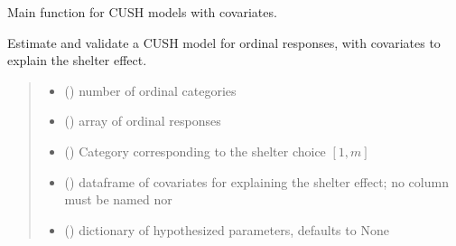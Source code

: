 \documentclass[letterpaper,10pt,english]{sphinxmanual}
\begin{document}

\begin{fulllineitems}
\label{\detokenize{cubmods:cubmods.cush_x.mle}}
\pysigstartsignatures
{}
\pysigstopsignatures
\sphinxAtStartPar
Main function for CUSH models with covariates.

\sphinxAtStartPar
Estimate and validate a CUSH model for ordinal responses, with covariates
to explain the shelter effect.
\begin{quote}\begin{description}
\begin{itemize}
\item {} 
\sphinxAtStartPar
{} () \textendash{} number of ordinal categories

\item {} 
\sphinxAtStartPar
{} () \textendash{} array of ordinal responses

\item {} 
\sphinxAtStartPar
{} () \textendash{} Category corresponding to the shelter choice \([1,m]\)

\item {} 
\sphinxAtStartPar
{} () \textendash{} dataframe of covariates for explaining the shelter effect;
no column must be named  nor 

\item {} 
\sphinxAtStartPar
{} (\sphinxstyleliteralemphasis{\sphinxupquote{, }}) \textendash{} dictionary of hypothesized parameters, defaults to None


\end{itemize}
\end{description}
\end{quote}
\end{fulllineitems}
\end{document}
